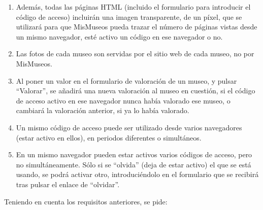 \begin{enumerate}
\item Además, todas las páginas HTML (incluido el formulario para introducir el código de acceso) incluirán una imagen transparente, de un píxel, que se utilizará para que MisMuseos pueda trazar el número de páginas vistas desde un mismo navegador, esté activo un código en ese navegador o no.

\item Las fotos de cada museo son servidas por el sitio web de cada museo, no por MisMuseos.

\item Al poner un valor en el formulario de valoración de un museo, y pulsar ``Valorar'', se añadirá una nueva valoración al museo en cuestión, si el código de acceso activo en ese navegador nunca había valorado ese museo, o cambiará la valoración anterior, si ya lo había valorado.

\item Un mismo código de acceso puede ser utilizado desde varios navegadores (estar activo en ellos), en periodos diferentes o simultáneos.

\item En un mismo navegador pueden estar activos varios códigos de acceso, pero  no simultáneamente. Sólo si se ``olvida'' (deja de estar activo) el que se está usando, se podrá activar otro, introduciéndolo en el formulario que se recibirá tras pulsar el enlace de ``olvidar''.

\end{enumerate}


Teniendo en cuenta los requisitos anteriores, se pide:

